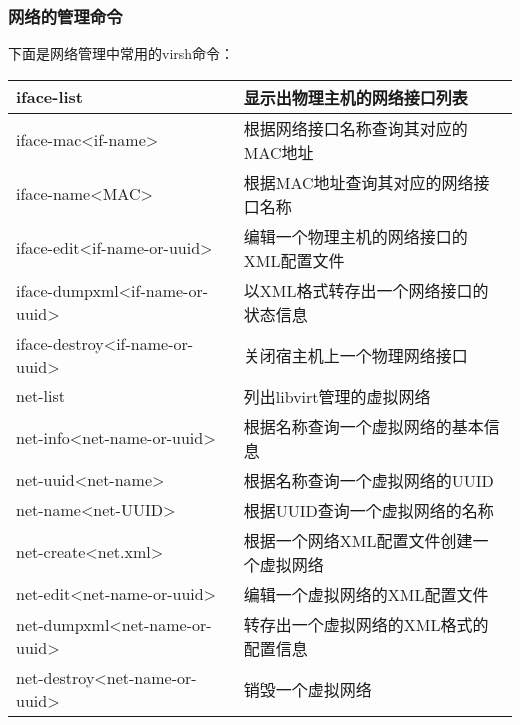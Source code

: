 \documentclass[a4paper,left=2.5cm,right=2.5cm,11pt]{article}
\begin{document}
\subsubsection{网络的管理命令}
	下面是网络管理中常用的virsh命令：
	\begin{longtable}{p{6cm}p{7cm}}
	\hline
	iface-list & 显示出物理主机的网络接口列表 \\
	\hline
	iface-mac<if-name> & 根据网络接口名称查询其对应的MAC地址 \\
	\hline
	iface-name<MAC> & 根据MAC地址查询其对应的网络接口名称 \\
	\hline
	iface-edit<if-name-or-uuid> & 编辑一个物理主机的网络接口的XML配置文件 \\
	\hline
	iface-dumpxml<if-name-or-uuid> & 以XML格式转存出一个网络接口的状态信息 \\
	\hline
	iface-destroy<if-name-or-uuid> & 关闭宿主机上一个物理网络接口 \\
	\hline
	net-list & 列出libvirt管理的虚拟网络 \\
	\hline
	net-info<net-name-or-uuid> & 根据名称查询一个虚拟网络的基本信息 \\
	\hline
	net-uuid<net-name> & 根据名称查询一个虚拟网络的UUID \\
	\hline
	net-name<net-UUID> & 根据UUID查询一个虚拟网络的名称 \\
	\hline
	net-create<net.xml> & 根据一个网络XML配置文件创建一个虚拟网络 \\
	\hline
	net-edit<net-name-or-uuid> & 编辑一个虚拟网络的XML配置文件 \\
	\hline
	net-dumpxml<net-name-or-uuid> & 转存出一个虚拟网络的XML格式的配置信息 \\
	\hline
	net-destroy<net-name-or-uuid> & 销毁一个虚拟网络 \\
	\hline 
	\end{longtable}
\end{document}
